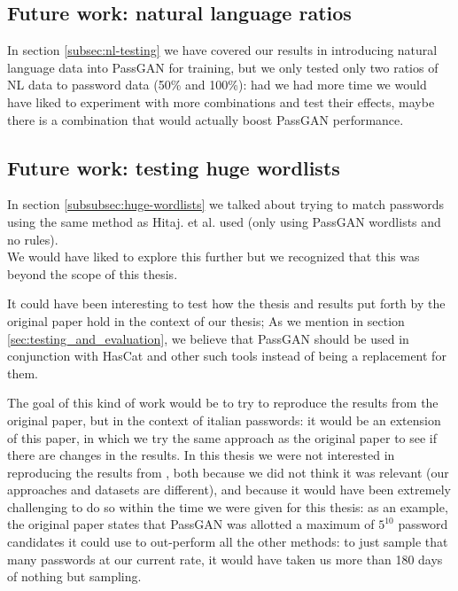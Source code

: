 \subsection{Future work: natural language ratios}
In section \ref{subsec:nl-testing} we have covered our results in introducing natural language data into PassGAN for training, but we only tested only two ratios of NL data to password data (50\% and 100\%): had we had more time we would have liked to experiment with more combinations and test their effects, maybe there is a combination that would actually boost PassGAN performance.

\subsection{Future work: testing huge wordlists}
In section \ref{subsubsec:huge-wordlists} we talked about trying to match passwords using the same method as Hitaj. et al. used (only using PassGAN wordlists and no rules).\\
We would have liked to explore this further but we recognized that this was beyond the scope of this thesis. 

It could have been interesting to test how the thesis and results put forth by the original paper hold in the context of our thesis; As we mention in section \ref{sec:testing_and_evaluation}, we believe that PassGAN should be used in conjunction with HasCat and other such tools instead of being a replacement for them.

The goal of this kind of work would be to try to reproduce the results from the original paper, but in the context of italian passwords: it would be an extension of this paper, in which we try the same approach as the original paper to see if there are changes in the results.
In this thesis we were not interested in reproducing the results from \cite{PassGAN}, both because we did not think it was relevant (our approaches and datasets are different), and because it would have been extremely challenging to do so within the time we were given for this thesis: as an example, the original paper states that PassGAN was allotted a maximum of $5^{10}$ password candidates it could use to out-perform all the other methods: to just sample that many passwords at our current rate, it would have taken us more than 180 days of nothing but sampling.

